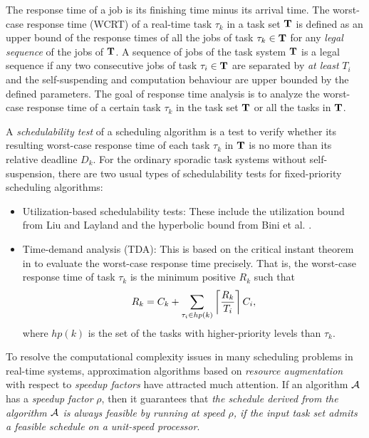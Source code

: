 The response time of a job is its finishing time minus its arrival
time.  The worst-case response time (WCRT) of a real-time task
$\tau_k$ in a task set ${\bf T}$ is defined as an upper bound of the
response times of all the jobs of task $\tau_k \in {\bf T}$ for any
\emph{legal sequence} of the jobs of ${\bf T}$. A sequence of jobs of
the task system ${\bf T}$ is a legal sequence if any two consecutive
jobs of task $\tau_i \in {\bf T}$ are separated by \emph{at least}
$T_i$ and the self-suspending and computation behaviour are upper
bounded by the defined parameters. The goal of response time analysis is to
analyze the worst-case response time of a certain task $\tau_k$ in the
task set ${\bf T}$ or all the tasks in ${\bf T}$.

A \emph{schedulability test} of a scheduling algorithm is a test to
verify whether its resulting worst-case response time of each task
$\tau_k$ in ${\bf T}$ is no more than its relative deadline $D_k$. For
the ordinary sporadic task systems without self-suspension, there are
two usual types of schedulability tests for fixed-priority scheduling
algorithms:
\begin{itemize}
\item Utilization-based schedulability tests: These include the
  utilization bound from Liu and Layland \cite{Liu_1973}  and the
  hyperbolic bound from Bini et al. \cite{bini2003rate}.
\item Time-demand analysis (TDA): This is based on the critical instant
  theorem in
  \cite{Liu_1973} to evaluate the worst-case response time
  precisely. That is, the worst-case response time of task $\tau_k$ is
  the minimum positive $R_k$ such that
  \[
  R_k = C_k+ \sum_{\tau_i \in hp(k)}\left\lceil{\frac{R_k}{T_i}}\right\rceil C_i, 
  \]
  where $hp(k)$ is the set of the tasks with higher-priority levels
  than $\tau_k$.  
\end{itemize}


To resolve the computational complexity issues in many scheduling problems in real-time systems, approximation algorithms based on \textit{resource augmentation} with respect to \emph{speedup factors} have attracted much attention.  If an algorithm ${\cal A}$ has a \emph{speedup factor} $\rho$, then it guarantees that \emph{the schedule derived from the algorithm ${\cal A}$ is always feasible by running at speed $\rho$, if the input task set admits a feasible schedule on a unit-speed processor}. 


